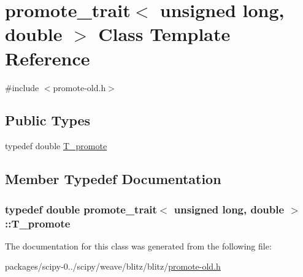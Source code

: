 \hypertarget{classpromote__trait_3_01unsigned_01long_00_01double_01_4}{}\section{promote\+\_\+trait$<$ unsigned long, double $>$ Class Template Reference}
\label{classpromote__trait_3_01unsigned_01long_00_01double_01_4}


{\ttfamily \#include $<$promote-\/old.\+h$>$}

\subsection*{Public Types}
\begin{DoxyCompactItemize}
\item 
typedef double \hyperlink{classpromote__trait_3_01unsigned_01long_00_01double_01_4_abfb71845b9353cc9156bdc62714a909c}{T\+\_\+promote}
\end{DoxyCompactItemize}


\subsection{Member Typedef Documentation}
\hypertarget{classpromote__trait_3_01unsigned_01long_00_01double_01_4_abfb71845b9353cc9156bdc62714a909c}{}
\subsubsection[{T\+\_\+promote}]{\setlength{\rightskip}{0pt plus 5cm}typedef double {\bf promote\+\_\+trait}$<$ unsigned long, double $>$\+::{\bf T\+\_\+promote}}\label{classpromote__trait_3_01unsigned_01long_00_01double_01_4_abfb71845b9353cc9156bdc62714a909c}


The documentation for this class was generated from the following file\+:\begin{DoxyCompactItemize}
\item 
packages/scipy-\/0../scipy/weave/blitz/blitz/\hyperlink{promote-old_8h}{promote-\/old.\+h}\end{DoxyCompactItemize}
